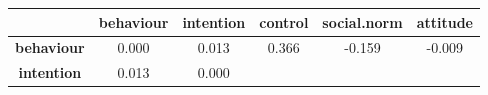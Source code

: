 \documentclass[]{article}
\theoremstyle{definition}
\theoremstyle{definition}
\theoremstyle{definition}
\theoremstyle{remark}
\begin{document}
\begin{longtable}[]{@{}cccccc@{}}
\toprule
\begin{minipage}[b]{0.20\columnwidth}\centering\strut
~\strut
\end{minipage} & \begin{minipage}[b]{0.13\columnwidth}\centering\strut
behaviour\strut
\end{minipage} & \begin{minipage}[b]{0.13\columnwidth}\centering\strut
intention\strut
\end{minipage} & \begin{minipage}[b]{0.11\columnwidth}\centering\strut
control\strut
\end{minipage} & \begin{minipage}[b]{0.15\columnwidth}\centering\strut
social.norm\strut
\end{minipage} & \begin{minipage}[b]{0.11\columnwidth}\centering\strut
attitude\strut
\end{minipage}\tabularnewline
\midrule
\endhead
\begin{minipage}[t]{0.20\columnwidth}\centering\strut
\textbf{behaviour}\strut
\end{minipage} & \begin{minipage}[t]{0.13\columnwidth}\centering\strut
0.000\strut
\end{minipage} & \begin{minipage}[t]{0.13\columnwidth}\centering\strut
0.013\strut
\end{minipage} & \begin{minipage}[t]{0.11\columnwidth}\centering\strut
0.366\strut
\end{minipage} & \begin{minipage}[t]{0.15\columnwidth}\centering\strut
-0.159\strut
\end{minipage} & \begin{minipage}[t]{0.11\columnwidth}\centering\strut
-0.009\strut
\end{minipage}\tabularnewline
\begin{minipage}[t]{0.20\columnwidth}\centering\strut
\textbf{intention}\strut
\end{minipage} & \begin{minipage}[t]{0.13\columnwidth}\centering\strut
0.013\strut
\end{minipage} & \begin{minipage}[t]{0.13\columnwidth}\centering\strut
0.000\strut
\end{minipage} & \begin{minipage}[t]{0.11\columnwidth}\centering\strut

\end{minipage}
\end{longtable}
\end{document}
